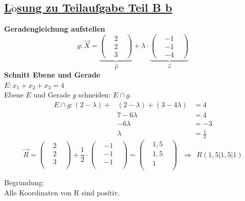 \documentclass[a4 paper, 12pt]{report}
\theoremstyle{plain}
\begin{document}
\subsection*{\underline{L$\ddot{\mbox{o}}$sung zu Teilaufgabe Teil B b}}
\textbf{\large Geradengleichung aufstellen}
$$
g:\stackrel{\longrightarrow}{X} = \underbrace{\begin{pmatrix}&2&\\&2&\\&3&\end{pmatrix}}_{\stackrel{\longrightarrow}{P}}
+\lambda\cdot \underbrace{\begin{pmatrix}&-1&\\&-1&\\&-4&\end{pmatrix}}_{\stackrel{\longrightarrow}{v}}
$$
\textbf{Schnitt Ebene und Gerade}\\
$E:x_1+x_2+x_3 = 4$\\
Ebene $E$ und Gerade $g$ schneiden: $E\cap g$.
\begin{align*}
E\cap g: (2-\lambda)+&(2-\lambda)+(3-4\lambda)& = 4\\
&7-6\lambda& = 4\\
&-6\lambda& = -3\\
&\lambda& = \frac{1}{2}
\end{align*}
$$
\stackrel{\longrightarrow}{R} = 
\begin{pmatrix}
&2&\\
&2&\\
&3&\\
\end{pmatrix}
+\frac{1}{2}\cdot
\begin{pmatrix}
&-1&\\
&-1&\\
&-1&\\
\end{pmatrix}
=
\begin{pmatrix}
&1,5&\\
&1,5&\\
&1&\\
\end{pmatrix}
~~~\Longrightarrow~~ R(1,5|1,5|1)
$$

Begr$\ddot{\mbox{u}}$ndung:\\
Alle Koordinaten von R sind positiv.
\end{document}
